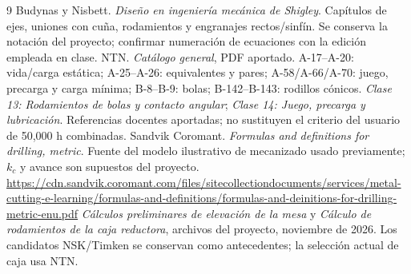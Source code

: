 \documentclass[11pt,a4paper]{article}
\begin{document}
\begin{thebibliography}{9}
 Budynas y Nisbett. \emph{Diseño en ingeniería mecánica de Shigley}. Capítulos de ejes, uniones con cuña, rodamientos y engranajes rectos/sinfín. Se conserva la notación del proyecto; confirmar numeración de ecuaciones con la edición empleada en clase.
 NTN. \emph{Catálogo general}, PDF aportado. A-17--A-20: vida/carga estática; A-25--A-26: equivalentes y pares; A-58/A-66/A-70: juego, precarga y carga mínima; B-8--B-9: bolas; B-142--B-143: rodillos cónicos.
 \emph{Clase 13: Rodamientos de bolas y contacto angular}; \emph{Clase 14: Juego, precarga y lubricación}. Referencias docentes aportadas; no sustituyen el criterio del usuario de 50,000 h combinadas.
 Sandvik Coromant. \emph{Formulas and definitions for drilling, metric}. Fuente del modelo ilustrativo de mecanizado usado previamente; $k_c$ y avance son supuestos del proyecto. \url{https://cdn.sandvik.coromant.com/files/sitecollectiondocuments/services/metal-cutting-e-learning/formulas-and-definitions/formulas-and-deinitions-for-drilling-metric-enu.pdf}
 \emph{Cálculos preliminares de elevación de la mesa} y \emph{Cálculo de rodamientos de la caja reductora}, archivos del proyecto, noviembre de 2026. Los candidatos NSK/Timken se conservan como antecedentes; la selección actual de caja usa NTN.
\end{thebibliography}
\end{document}
